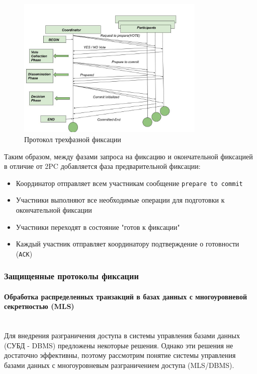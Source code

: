 \begin{figure}[h!]
    \centering
    \includegraphics[width=0.8\textwidth]{assets/distributed/3PhaseCommit.png}
    \caption{Протокол трехфазной фиксации}
    \label{3pc}
\end{figure}

Таким образом, между фазами запроса на фиксацию и окончательной фиксацией в отличие от 2PC добавляется фаза предварительной фиксации:

\begin{itemize}
    \item Координатор отправляет всем участникам сообщение \texttt{prepare to commit}
    \item Участники выполняют все необходимые операции для подготовки к окончательной фиксации
    \item Участники переходят в состояние "готов к фиксации"
    \item Каждый участник отправляет координатору подтверждение о готовности (\texttt{ACK})
\end{itemize}

\subsubsection{Защищенные протоколы фиксации}

\paragraph{Обработка распределенных транзакций в базах данных с многоуровневой секретностью (MLS)}~\\

Для внедрения разграничения доступа в системы  управления  базами  данных  (СУБД  -
DBMS)  предложены некоторые решения. Однако эти решения не достаточно
эффективны, поэтому рассмотрим понятие  системы
управления  базами  данных  с  многоуровневым  разграничением доступа (MLS/DBMS).

